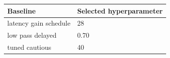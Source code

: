 \begin{tabular}{ll}\toprule
Baseline & Selected hyperparameter\\
\midrule
latency gain schedule & 28\\
low pass delayed & 0.70\\
tuned cautious & 40\\
\bottomrule\end{tabular}
